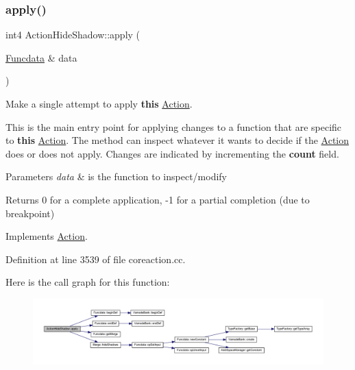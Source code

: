\subsubsection{\texorpdfstring{apply()}{apply()}}
{\footnotesize\ttfamily int4 Action\+Hide\+Shadow\+::apply (\begin{DoxyParamCaption}\item[{\mbox{\hyperlink{class_funcdata}{Funcdata}} \&}]{data }\end{DoxyParamCaption})\hspace{0.3cm}{\ttfamily [virtual]}}



Make a single attempt to apply {\bfseries{this}} \mbox{\hyperlink{class_action}{Action}}. 

This is the main entry point for applying changes to a function that are specific to {\bfseries{this}} \mbox{\hyperlink{class_action}{Action}}. The method can inspect whatever it wants to decide if the \mbox{\hyperlink{class_action}{Action}} does or does not apply. Changes are indicated by incrementing the {\bfseries{count}} field. 
\begin{DoxyParams}{Parameters}
{\em data} & is the function to inspect/modify \\
\hline
\end{DoxyParams}
\begin{DoxyReturn}{Returns}
0 for a complete application, -\/1 for a partial completion (due to breakpoint) 
\end{DoxyReturn}


Implements \mbox{\hyperlink{class_action_aac1c3999d6c685b15f5d9765a4d04173}{Action}}.



Definition at line 3539 of file coreaction.\+cc.

Here is the call graph for this function\+:
\nopagebreak
\begin{figure}[H]
\begin{center}
\leavevmode
\includegraphics[width=350pt]{class_action_hide_shadow_a2f3d4cba003d9e55f07c2754280caf22_cgraph}
\end{center}
\end{figure}
\mbox{\label{class_action_hide_shadow_a5b763cb14e0381b879231c4922d00f5b}} 
